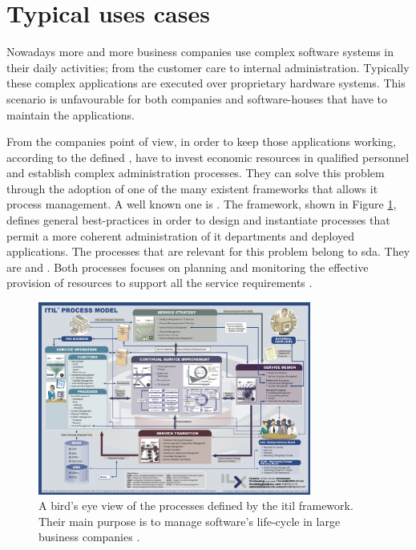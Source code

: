 %
%
\section[Typical use cases]{Typical uses cases}
\label{sec:background-useCases}
Nowadays more and more business companies use complex software systems in their daily activities;
from the customer care to internal administration. Typically these complex applications are executed
over proprietary hardware systems. This scenario is unfavourable for both companies and software-houses
that have to maintain the applications.

From the companies point of view, in order to keep those applications working, according
to the defined , have to invest economic resources in qualified personnel and establish complex
administration processes. They can solve this problem through the adoption of one of the many existent
frameworks that allows \acs{it} process management. A well known one is .
The framework, shown in Figure \ref{img:background-useCases-itilProcessModel}, defines general
best-practices in order to design and instantiate processes that permit a more coherent 
administration of \acs{it} departments and deployed applications. The processes that are relevant for
this problem belong to \ac{sda}. They are   and . Both processes
focuses on planning and monitoring the effective provision of resources to support all the service
requirements \cite{availabilityCapacityProcesses}.

\begin{figure}
	\centering{}
	\includegraphics[width=0.8\textwidth]{chapters/background/images/itil-map.png}
	\caption[\acs{itil} v3 process model]{A bird's eye view of the processes defined by the \acf{itil} 
		framework. Their main purpose is to manage software's life-cycle in large business companies
		\cite{itilProcessModel}.}
	\label{img:background-useCases-itilProcessModel}
\end{figure}

